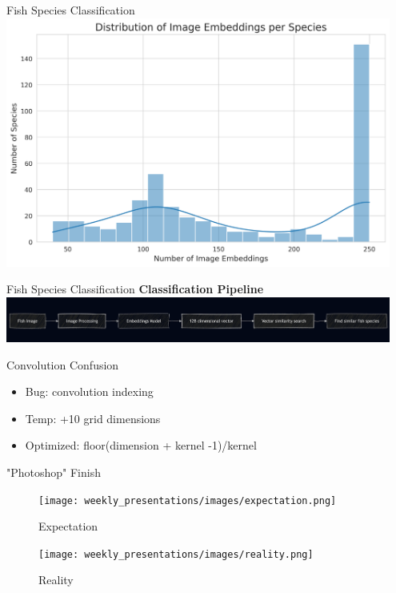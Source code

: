 \begin{frame}{Fish Species Classification}
    \centering
    \includegraphics[height=0.8\textheight,width=0.95\textwidth,keepaspectratio]{images/embedding_distribution_histogram.png}
\end{frame}

\begin{frame}{Fish Species Classification}
    \centering
    \textbf{\LARGE Classification Pipeline} \\[1em]
    \includegraphics[height=0.8\textheight, width=0.95\textwidth, keepaspectratio]{images/classification_pipe.png}
\end{frame}

\begin{frame}{Convolution Confusion}
    \begin{itemize}
        \item Bug: convolution indexing
        \item Temp: +10 grid dimensions
        \item Optimized: floor(dimension + kernel -1)/kernel
    \end{itemize}    
\end{frame}

\begin{frame}{"Photoshop" Finish}
    \centering
    \begin{figure}
        \texttt{[image: weekly\_presentations/images/expectation.png]}
        \caption{Expectation}

        \vspace{1em}

        \texttt{[image: weekly\_presentations/images/reality.png]}
        \caption{Reality}
        
    \end{figure}
\end{frame}

